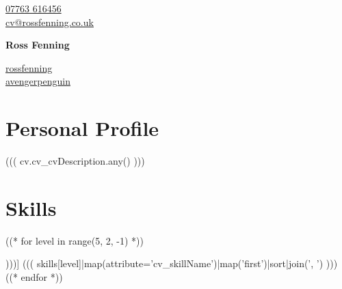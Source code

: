 \documentclass[10pt]{article}
\begin{document}
\begin{multicols}{3}
  \begin{flushleft}
    {\color{icnclr}} \href{tel:+447763616456}{07763 616456} \\
    {\color{icnclr}\faEnvelope[regular]} \href{mailto:cv@rossfenning.co.uk}{cv@rossfenning.co.uk} \\
  \end{flushleft}

\columnbreak

  \begin{center}
      {\huge\bfseries Ross Fenning}
  \end{center}

\columnbreak

  \begin{flushright}
    \href{https://www.linkedin.com/in/rossfenning/}{rossfenning} {\color{icnclr}\faLinkedinIn} \\
    \href{https://github.com/avengerpenguin}{avengerpenguin} {\color{icnclr}\faGithub} \\
  \end{flushright}
\end{multicols}



\section*{Personal Profile}
((( cv.cv_cvDescription.any() )))

\section*{Skills}

\begin{description}
((* for level in range(5, 2, -1) *))
\item[((( skill_levels[level] )))] ((( skills[level]|map(attribute='cv_skillName')|map('first')|sort|join(', ') )))
((* endfor *))
\end{description}
\end{document}
